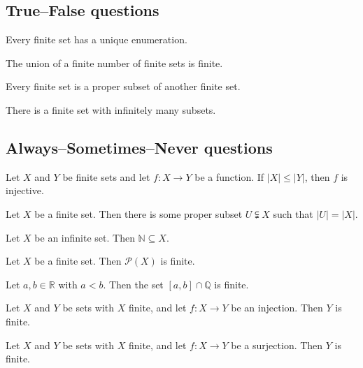 \subsection*{True--False questions}


\begin{chapex} %
\label{cqFiniteInfiniteSetsTFBegin}
Every finite set has a unique enumeration.
\end{chapex}

\begin{chapex} %
The union of a finite number of finite sets is finite.
\end{chapex}

\begin{chapex} %
Every finite set is a proper subset of another finite set.
\end{chapex}

\begin{chapex} %
\label{cqFiniteInfiniteSetsTFEnd}
There is a finite set with infinitely many subsets.
\end{chapex}

\subsection*{Always--Sometimes--Never questions}


\begin{chapex} %
\label{cqFiniteInfiniteSetsASNBegin}
Let $X$ and $Y$ be finite sets and let $f : X \to Y$ be a function. If $|X| \le |Y|$, then $f$ is injective.
\end{chapex}

\begin{chapex} %
Let $X$ be a finite set. Then there is some proper subset $U \subsetneqq X$ such that $|U| = |X|$.
\end{chapex}

\begin{chapex} %
Let $X$ be an infinite set. Then $\mathbb{N} \subseteq X$.
\end{chapex}

\begin{chapex} %
Let $X$ be a finite set. Then $\mathcal{P}(X)$ is finite.
\end{chapex}

\begin{chapex} %
Let $a,b \in \mathbb{R}$ with $a<b$. Then the set $[a,b] \cap \mathbb{Q}$ is finite.
\end{chapex}

\begin{chapex} %
Let $X$ and $Y$ be sets with $X$ finite, and let $f : X \to Y$ be an injection. Then $Y$ is finite.
\end{chapex}

\begin{chapex} %
\label{cqFiniteInfiniteSetsASNEnd}
Let $X$ and $Y$ be sets with $X$ finite, and let $f : X \to Y$ be a surjection. Then $Y$ is finite.
\end{chapex}